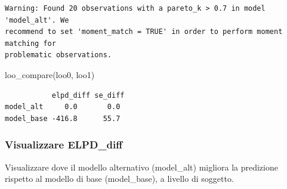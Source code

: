 \documentclass[
  11pt,
  a4paper,
  onecolumn]{article}
\newenvironment{Shaded}{}{}
\newcommand{\CommentTok}[1]{\textcolor[rgb]{0.42,0.45,0.49}{#1}}
\newcommand{\FunctionTok}[1]{\textcolor[rgb]{0.44,0.26,0.76}{#1}}
\newcommand{\NormalTok}[1]{\textcolor[rgb]{0.14,0.16,0.18}{#1}}
\newcommand{\OtherTok}[1]{\textcolor[rgb]{0.44,0.26,0.76}{#1}}
\newcommand{\SpecialCharTok}[1]{\textcolor[rgb]{0.00,0.36,0.77}{#1}}
\newcommand{\StringTok}[1]{\textcolor[rgb]{0.01,0.18,0.38}{#1}}
\begin{document}
\begin{verbatim}
Warning: Found 20 observations with a pareto_k > 0.7 in model 'model_alt'. We
recommend to set 'moment_match = TRUE' in order to perform moment matching for
problematic observations.
\end{verbatim}

\begin{Shaded}
\begin{Highlighting}[]
\FunctionTok{loo\_compare}\NormalTok{(loo0, loo1)}
\end{Highlighting}
\end{Shaded}

\begin{verbatim}
           elpd_diff se_diff
model_alt     0.0       0.0 
model_base -416.8      55.7 
\end{verbatim}

\subsubsection{Visualizzare ELPD\_diff}\label{visualizzare-elpd_diff}

Visualizzare dove il modello alternativo (model\_alt) migliora la
predizione rispetto al modello di base (model\_base), a livello di
soggetto.

\begin{Shaded}
\end{Shaded}

\begin{Shaded}
\end{Shaded}
\end{document}
